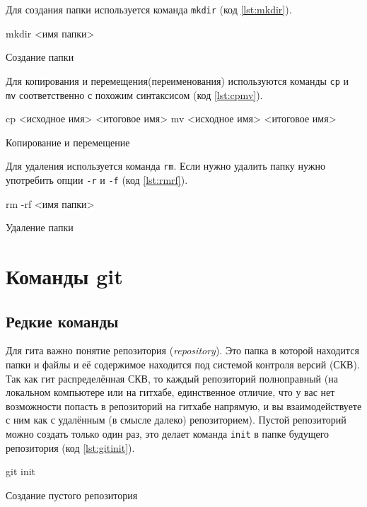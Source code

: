 \documentclass[12pt]{article}
\begin{document}
Для создания папки используется команда \verb|mkdir| (код \ref{lst:mkdir}).
\begin{listing}[H]
\begin{center}
\begin{bashcode}
mkdir <имя папки>
\end{bashcode}
\end{center}
\caption{Создание папки}
\label{lst:mkdir}
\end{listing}

Для копирования и перемещения(переименования) используются команды \verb|cp| и \verb|mv| соответственно с похожим синтаксисом (код \ref{lst:cpmv}).
\begin{listing}[H]
\begin{center}
\begin{bashcode}
cp <исходное имя> <итоговое имя>
mv <исходное имя> <итоговое имя>
\end{bashcode}
\end{center}
\caption{Копирование и перемещение}
\label{lst:cpmv}
\end{listing}

Для удаления используется команда \verb|rm|. Если нужно удалить папку нужно употребить опции \verb|-r| и \verb|-f| (код \ref{lst:rmrf}).
\begin{listing}[H]
\begin{center}
\begin{bashcode}
rm -rf <имя папки>
\end{bashcode}
\end{center}
\caption{Удаление папки}
\label{lst:rmrf}
\end{listing}

\section{Команды git}
\subsection{Редкие команды}

Для гита важно понятие репозитория (\textit{repository}). Это папка в которой находится папки и файлы и её содержимое находится под системой контроля версий (СКВ). Так как гит распределённая СКВ, то каждый репозиторий полноправный (на локальном компьютере или на гитхабе, единственное отличие, что у вас нет возможности попасть в репозиторий на гитхабе напрямую, и вы взаимодействуете с ним как с удалённым (в смысле далеко) репозиторием). Пустой репозиторий можно создать только один раз, это делает команда \verb|init| в папке будущего репозитория (код \ref{lst:gitinit}).
\begin{listing}[H]
\begin{center}
\begin{bashcode}
git init
\end{bashcode}
\end{center}
\caption{Создание пустого репозитория}
\label{lst:gitinit}
\end{listing}
\end{document}
